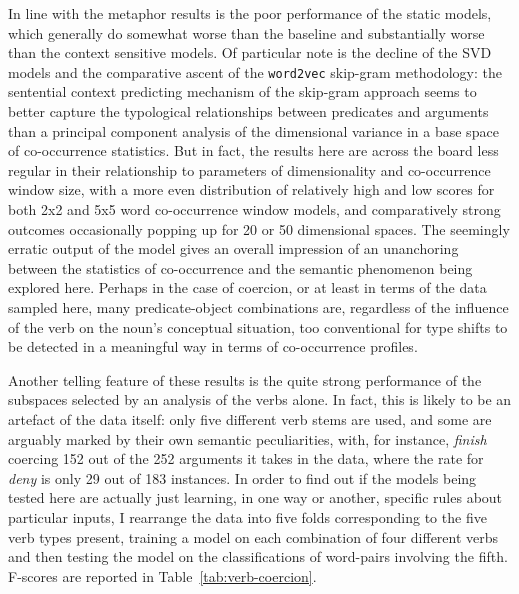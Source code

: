 In line with the metaphor results is the poor performance of the static models, which generally do somewhat worse than the baseline and substantially worse than the context sensitive models.  Of particular note is the decline of the \textsc{SVD} models and the comparative ascent of the \texttt{word2vec} skip-gram methodology: the sentential context predicting mechanism of the skip-gram approach seems to better capture the typological relationships between predicates and arguments than a principal component analysis of the dimensional variance in a base space of co-occurrence statistics.  But in fact, the results here are across the board less regular in their relationship to parameters of dimensionality and co-occurrence window size, with a more even distribution of relatively high and low scores for both 2x2 and 5x5 word co-occurrence window models, and comparatively strong outcomes occasionally popping up for 20 or 50 dimensional spaces.  The seemingly erratic output of the model gives an overall impression of an unanchoring between the statistics of co-occurrence and the semantic phenomenon being explored here.  Perhaps in the case of coercion, or at least in terms of the data sampled here, many predicate-object combinations are, regardless of the influence of the verb on the noun's conceptual situation, too conventional for type shifts to be detected in a meaningful way in terms of co-occurrence profiles.

Another telling feature of these results is the quite strong performance of the subspaces selected by an analysis of the verbs alone.  In fact, this is likely to be an artefact of the data itself: only five different verb stems are used, and some are arguably marked by their own semantic peculiarities, with, for instance, \emph{finish} coercing 152 out of the 252 arguments it takes in the data, where the rate for \emph{deny} is only 29 out of 183 instances.  In order to find out if the models being tested here are actually just learning, in one way or another, specific rules about particular inputs, I rearrange the data into five folds corresponding to the five verb types present, training a model on each combination of four different verbs and then testing the model on the classifications of word-pairs involving the fifth.  F-scores are reported in Table~\ref{tab:verb-coercion}.

